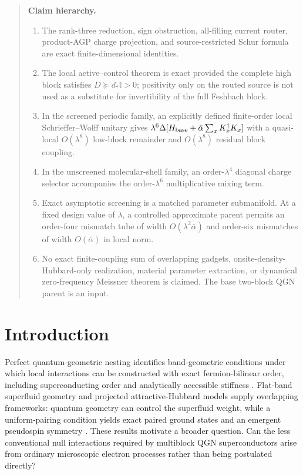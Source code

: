 \documentclass[11pt]{article}
\theoremstyle{definition}
\theoremstyle{remark}
\newcommand{\Id}{\mathbb I}
\begin{document}
\begin{quote}\small
\textbf{Claim hierarchy.}
\begin{enumerate}[leftmargin=1.6em,itemsep=0.12em,topsep=0.2em]
\item The rank-three reduction, sign obstruction, all-filling current router, product-AGP charge projection, and source-restricted Schur formula are exact finite-dimensional identities.
\item The local active--control theorem is exact provided the complete high block satisfies $D\succeq d_*\Id>0$; positivity only on the routed source is not used as a substitute for invertibility of the full Feshbach block.
\item In the screened periodic family, an explicitly defined finite-order local Schrieffer--Wolff unitary gives $\lambda^6\Delta[H_{\rm base}+\bar\alpha\sum_xK_x^\dagger K_x]$ with a quasi-local $O(\lambda^8)$ low-block remainder and $O(\lambda^8)$ residual block coupling.
\item In the unscreened molecular-shell family, an order-$\lambda^4$ diagonal charge selector accompanies the order-$\lambda^6$ multiplicative mixing term.
\item Exact asymptotic screening is a matched parameter submanifold.  At a fixed design value of $\lambda$, a controlled approximate parent permits an order-four mismatch tube of width $O(\lambda^2\bar\alpha)$ and order-six mismatches of width $O(\bar\alpha)$ in local norm.
\item No exact finite-coupling sum of overlapping gadgets, onsite-density-Hubbard-only realization, material parameter extraction, or dynamical zero-frequency Meissner theorem is claimed.  The base two-block QGN parent is an input.
\end{enumerate}
\end{quote}

\section{Introduction}

Perfect quantum-geometric nesting identifies band-geometric conditions under which local interactions can be constructed with exact fermion-bilinear order, including superconducting order and analytically accessible stiffness \cite{Han2024}.  Flat-band superfluid geometry and projected attractive-Hubbard models supply overlapping frameworks: quantum geometry can control the superfluid weight, while a uniform-pairing condition yields exact paired ground states and an emergent pseudospin symmetry \cite{Peotta2015,Tovmasyan2016}.  These results motivate a broader question.  Can the less conventional null interactions required by multiblock QGN superconductors arise from ordinary microscopic electron processes rather than being postulated directly?
\end{document}
